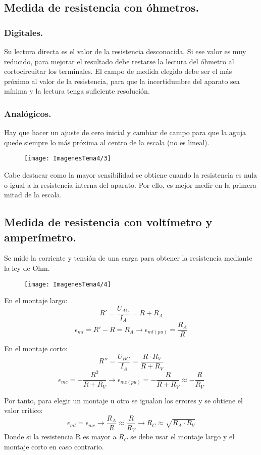 \subsection{Medida de resistencia con óhmetros.}
\subsubsection{Digitales.}
Su lectura directa es el valor de la resistencia desconocida. Si ese valor es muy reducido, para mejorar el resultado debe restarse la lectura del óhmetro al cortocircuitar los terminales.  El campo de medida elegido debe ser el más próximo al
valor de la resistencia, para que la incertidumbre del
aparato sea mínima y la lectura tenga suficiente resolución.
\subsubsection{Analógicos.}
Hay que hacer un ajuste de cero inicial y cambiar de campo
para que la aguja quede siempre lo más próxima al centro
de la escala (no es lineal).
\begin{figure}[H]
	\centering
	\texttt{[image: ImagenesTema4/3]}
	\label{fig:3}
\end{figure}



Cabe destacar como la mayor sensibilidad se obtiene cuando la resistencia es nula o igual a la resistencia interna del aparato. Por ello, es mejor medir en la primera mitad de la escala.
\subsection{Medida de resistencia con voltímetro y amperímetro.}
Se mide la corriente y tensión de una carga para obtener la resistencia mediante la ley de Ohm.
\begin{figure}[H]
	\centering
	\label{fig:4}
	\texttt{[image: ImagenesTema4/4]}
\end{figure}

En el montaje largo:
\[R'=\frac{U_{AC}}{I_A}=R+R_A\]
\[\epsilon_{ml}=R'-R=R_A \rightarrow \epsilon_{ml(pu)}=\frac{R_A}{R}\]

En el montaje corto:
\[R''=\frac{U_{BC}}{I_A}=\frac{R\cdot R_V}{R+R_V}\]
\[\epsilon_{mc}=-\frac{R^2}{R+R_V} \rightarrow \epsilon_{mc(pu)}=-\frac{R}{R+R_V}\approx-\frac{R}{R_V}\]

Por tanto, para elegir un montaje u otro se igualan los errores y se obtiene el valor crítico:
\[\epsilon_{ml}=\epsilon_{mc}\rightarrow \frac{R_A}{R}\approx\frac{R}{R_V}\rightarrow R_C\approx\sqrt{R_A\cdot R_V}\]
Donde si la resistencia R es mayor a $R_C$ se debe usar el montaje largo y el montaje corto en caso contrario.
